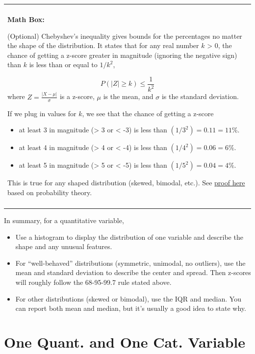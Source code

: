 \documentclass[
]{book}
\providecommand{\tightlist}{%
  \setlength{\itemsep}{0pt}\setlength{\parskip}{0pt}}
\newenvironment{mathbox}
{
    \begin{center}
    
    \begin{tabular}{|p{0.8\textwidth}|}
    \rowcolor{LightYellow}
    \hline\\
    \rowcolor{LightYellow}
    \textbf{Math Box:}
}
{
    \\\rowcolor{LightYellow}
    \\\hline
    \end{tabular} 
    \end{center}
}
\begin{document}
\begin{mathbox}
(Optional) Chebyshev's inequality gives bounds for the percentages no
matter the shape of the distribution. It states that for any real number
\(k\) \textgreater{} 0, the chance of getting a z-score greater in
magnitude (ignoring the negative sign) than \(k\) is less than or equal
to \(1/k^2\),

\[P\left(|Z| \geq k\right) \leq \frac{1}{k^2}\] where
\(Z = \frac{|X - \mu|}{\sigma}\) is a z-score, \(\mu\) is the mean, and
\(\sigma\) is the standard deviation.

If we plug in values for \(k\), we see that the chance of getting a
z-score

\begin{itemize}
\tightlist
\item
  at least 3 in magnitude (\textgreater{} 3 or \textless{} -3) is less
  than \((1/3^2) = 0.11 = 11\%\).
\item
  at least 4 in magnitude (\textgreater{} 4 or \textless{} -4) is less
  than \((1/4^2) = 0.06 = 6\%\).
\item
  at least 5 in magnitude (\textgreater{} 5 or \textless{} -5) is less
  than \((1/5^2) = 0.04 = 4\%\).
\end{itemize}

This is true for any shaped distribution (skewed, bimodal, etc.). See
\href{https://en.wikipedia.org/wiki/Markov\%27s_inequality}{proof here}
based on probability theory.
\end{mathbox}

In summary, for a quantitative variable,

\begin{itemize}
\tightlist
\item
  Use a histogram to display the distribution of one variable and describe the shape and any unusual features.
\item
  For ``well-behaved'' distributions (symmetric, unimodal, no outliers), use the mean and standard deviation to describe the center and spread. Then z-scores will roughly follow the 68-95-99.7 rule stated above.
\item
  For other distributions (skewed or bimodal), use the IQR and median. You can report both mean and median, but it's usually a good idea to state why.
\end{itemize}

\hypertarget{one-quant.-and-one-cat.-variable}{%
\section{One Quant. and One Cat. Variable}\label{one-quant.-and-one-cat.-variable}}
\end{document}
